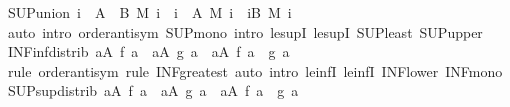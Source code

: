 \begin{isabellebody}
\endisatagproof
{\isafoldproof}%
%
\isadelimproof
\isanewline
%
\endisadelimproof
\isanewline
{}\isamarkupfalse%
\ SUP{\isacharunderscore}{\kern0pt}union{\isacharcolon}{\kern0pt}\ {\isachardoublequoteopen}{\isacharparenleft}{\kern0pt}{\isasymSqunion}i\ {\isasymin}\ A\ {\isasymunion}\ B{\isachardot}{\kern0pt}\ M\ i{\isacharparenright}{\kern0pt}\ {\isacharequal}{\kern0pt}\ {\isacharparenleft}{\kern0pt}{\isasymSqunion}i\ {\isasymin}\ A{\isachardot}{\kern0pt}\ M\ i{\isacharparenright}{\kern0pt}\ {\isasymsqunion}\ {\isacharparenleft}{\kern0pt}{\isasymSqunion}i{\isasymin}B{\isachardot}{\kern0pt}\ M\ i{\isacharparenright}{\kern0pt}{\isachardoublequoteclose}\isanewline
%
\isadelimproof
\ \ %
\endisadelimproof
%
\isatagproof
{}\isamarkupfalse%
\ {\isacharparenleft}{\kern0pt}auto\ intro{\isacharbang}{\kern0pt}{\isacharcolon}{\kern0pt}\ order{\isachardot}{\kern0pt}antisym\ SUP{\isacharunderscore}{\kern0pt}mono\ intro{\isacharcolon}{\kern0pt}\ le{\isacharunderscore}{\kern0pt}supI{}\ le{\isacharunderscore}{\kern0pt}supI{}\ SUP{\isacharunderscore}{\kern0pt}least\ SUP{\isacharunderscore}{\kern0pt}upper{\isacharparenright}{\kern0pt}%
\endisatagproof
{\isafoldproof}%
%
\isadelimproof
\isanewline
%
\endisadelimproof
\isanewline
{}\isamarkupfalse%
\ INF{\isacharunderscore}{\kern0pt}inf{\isacharunderscore}{\kern0pt}distrib{\isacharcolon}{\kern0pt}\ {\isachardoublequoteopen}{\isacharparenleft}{\kern0pt}{\isasymSqinter}a{\isasymin}A{\isachardot}{\kern0pt}\ f\ a{\isacharparenright}{\kern0pt}\ {\isasymsqinter}\ {\isacharparenleft}{\kern0pt}{\isasymSqinter}a{\isasymin}A{\isachardot}{\kern0pt}\ g\ a{\isacharparenright}{\kern0pt}\ {\isacharequal}{\kern0pt}\ {\isacharparenleft}{\kern0pt}{\isasymSqinter}a{\isasymin}A{\isachardot}{\kern0pt}\ f\ a\ {\isasymsqinter}\ g\ a{\isacharparenright}{\kern0pt}{\isachardoublequoteclose}\isanewline
%
\isadelimproof
\ \ %
\endisadelimproof
%
\isatagproof
{}\isamarkupfalse%
\ {\isacharparenleft}{\kern0pt}rule\ order{\isachardot}{\kern0pt}antisym{\isacharparenright}{\kern0pt}\ {\isacharparenleft}{\kern0pt}rule\ INF{\isacharunderscore}{\kern0pt}greatest{\isacharcomma}{\kern0pt}\ auto\ intro{\isacharcolon}{\kern0pt}\ le{\isacharunderscore}{\kern0pt}infI{}\ le{\isacharunderscore}{\kern0pt}infI{}\ INF{\isacharunderscore}{\kern0pt}lower\ INF{\isacharunderscore}{\kern0pt}mono{\isacharparenright}{\kern0pt}%
\endisatagproof
{\isafoldproof}%
%
\isadelimproof
\isanewline
%
\endisadelimproof
\isanewline
{}\isamarkupfalse%
\ SUP{\isacharunderscore}{\kern0pt}sup{\isacharunderscore}{\kern0pt}distrib{\isacharcolon}{\kern0pt}\ {\isachardoublequoteopen}{\isacharparenleft}{\kern0pt}{\isasymSqunion}a{\isasymin}A{\isachardot}{\kern0pt}\ f\ a{\isacharparenright}{\kern0pt}\ {\isasymsqunion}\ {\isacharparenleft}{\kern0pt}{\isasymSqunion}a{\isasymin}A{\isachardot}{\kern0pt}\ g\ a{\isacharparenright}{\kern0pt}\ {\isacharequal}{\kern0pt}\ {\isacharparenleft}{\kern0pt}{\isasymSqunion}a{\isasymin}A{\isachardot}{\kern0pt}\ f\ a\ {\isasymsqunion}\ g\ a{\isacharparenright}{\kern0pt}{\isachardoublequoteclose}\isanewline

\end{isabellebody}
